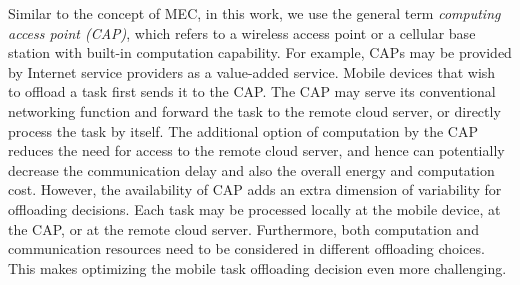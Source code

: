 \documentclass[10pt,journal,compsoc]{IEEEtran}
\begin{document}
Similar to the concept of MEC, in this work, we use the general term
\textit{computing access point (CAP)}, which refers to a wireless
access point or a cellular base station with built-in computation
capability. For example, CAPs may be provided by Internet service
providers as a value-added service. Mobile devices that wish to
offload a task first sends it to the CAP. The CAP may serve its
conventional networking function and forward the task to the remote
cloud server, or directly process the task by itself. The additional
option of computation by the CAP reduces the need for access to the
remote cloud server, and hence can potentially decrease the
communication delay and also the overall energy and computation
cost. However, the availability of CAP adds an extra dimension of
variability for offloading decisions. Each task may be processed
locally at the mobile device, at the CAP, or at the remote cloud
server. Furthermore, both computation and communication resources
need to be considered in different offloading choices. This makes
optimizing the mobile
task offloading decision even more challenging. %
\end{document}
